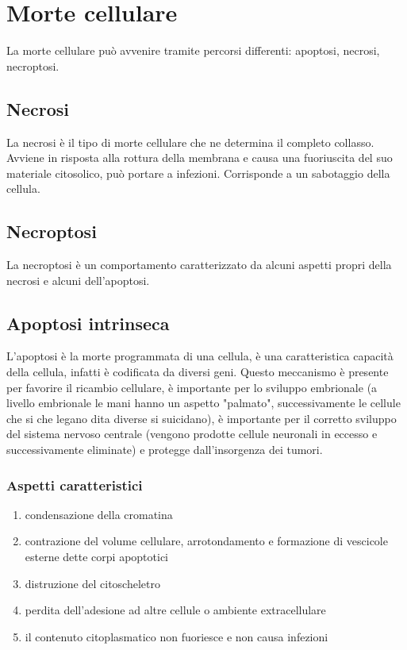 \section{Morte cellulare}
    La morte cellulare può avvenire tramite percorsi differenti: apoptosi, necrosi, necroptosi.
    
    \subsection{Necrosi}
        La necrosi è il tipo di morte cellulare che ne determina il completo collasso. Avviene in risposta alla rottura della membrana e causa una fuoriuscita del suo materiale citosolico, può portare a infezioni. Corrisponde a un sabotaggio della cellula.
        
    \subsection{Necroptosi}
        La necroptosi è un comportamento caratterizzato da alcuni aspetti propri della necrosi e alcuni dell'apoptosi. 
    
    \subsection{Apoptosi intrinseca}
        L'apoptosi è la morte programmata di una cellula, è una caratteristica capacità della cellula, infatti è codificata da diversi geni. 
        Questo meccanismo è presente per favorire il ricambio cellulare, è importante per lo sviluppo embrionale (a livello embrionale le mani hanno un aspetto "palmato", successivamente le cellule che si che legano dita diverse si suicidano), è importante per il corretto sviluppo del sistema nervoso centrale (vengono prodotte cellule neuronali in eccesso e successivamente eliminate) e protegge dall'insorgenza dei tumori.
        
        \subsubsection{Aspetti caratteristici}
            \begin{enumerate}
                \item condensazione della cromatina
                \item contrazione del volume cellulare, arrotondamento e formazione di vescicole esterne dette corpi apoptotici
                \item distruzione del citoscheletro
                \item perdita dell'adesione ad altre cellule o ambiente extracellulare
                \item il contenuto citoplasmatico non fuoriesce e non causa infezioni
            \end{enumerate}
        
